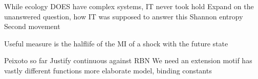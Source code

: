 \documentclass[../main.tex]{subfiles}
\begin{document}
While ecology DOES have complex systems, IT never took hold %
\cite{}
Expand on the unanswered question, how IT was supposed to answer this
Shannon entropy
Second movement

Useful measure is the halflife of the MI of a shock with the future state \cite{QuaxPersonal}


Peixoto so far
Justify continuous against RBN
We need an extension
motif has vastly different functions \cite{ingram2006network}
more elaborate model, binding constants	\cite{ingram2006network}
\end{document}
